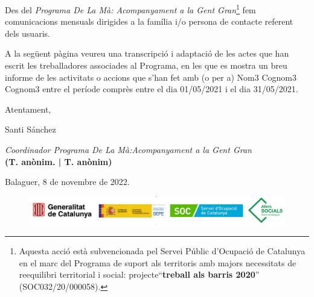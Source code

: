 \documentclass[a4paper,12pt]{elsarticle}  %
\begin{document}
Des del \textit{Programa De La Mà: Acompanyament a la Gent Gran}\footnote{Aquesta acció està subvencionada pel Servei Públic 
d'Ocupació de Catalunya en el marc del Programa de suport als territoris amb majors 
necessitats de reequilibri territorial i social: projecte``\textbf{treball als barris 2020}'' (SOC032/20/000058).} fem comunicacions mensuals
dirigides a la família i/o persona de contacte referent dels usuaris.


A la següent pàgina veureu una transcripció i adaptació de les actes que han escrit les treballadores associades
al Programa, en les que es mostra un breu informe de les activitats o accions que s'han fet amb (o per a) 
Nom3 Cognom3 Cognom3 entre el període comprès entre el dia 01/05/2021 i el dia 31/05/2021.

	\vspace{0.5cm}

\noindent Atentament,

\noindent Santi Sánchez

\noindent \textit{Coordinador Programa De La Mà:Acompanyament a la Gent Gran}\\
\textbf{(T. anònim. | T. anònim)}

	\vspace{0.5cm}

\noindent Balaguer, 8 de novembre de 2022.

	









\vfill

\FloatBarrier
\begin{figure}[h]
	\centering	
	\includegraphics[width=1\textwidth]{../IMATGES/logosGeneMinisterAferssocialsSoc.png}	
\end{figure}
\FloatBarrier	










\clearpage
\end{document}
